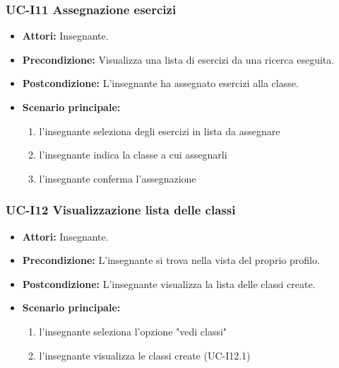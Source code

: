 \subsubsection{UC-I11 Assegnazione esercizi}
\begin{itemize}
	\item \textbf{Attori:} Insegnante.
	\item \textbf{Precondizione:} Visualizza una lista di esercizi da una ricerca eseguita.
	\item \textbf{Postcondizione:} L'insegnante ha assegnato esercizi alla classe.
	\item \textbf{Scenario principale:}
	\begin{enumerate}
		\item l'insegnante seleziona degli esercizi in lista da assegnare
		\item l'insegnante indica la classe a cui assegnarli
		\item l'insegnante conferma l'assegnazione
	\end{enumerate}
\end{itemize}

\subsubsection{UC-I12 Visualizzazione lista delle classi}		
\begin{itemize}
	\item \textbf{Attori:} Insegnante.
	\item \textbf{Precondizione:} L'insegnante si trova nella vista del proprio profilo.
	\item \textbf{Postcondizione:} L'insegnante visualizza la lista delle classi create.
	\item \textbf{Scenario principale:}
	\begin{enumerate}
		\item l'insegnante seleziona l'opzione "vedi classi"
		\item l'insegnante visualizza le classi create (UC-I12.1)
	\end{enumerate}		
\end{itemize}

